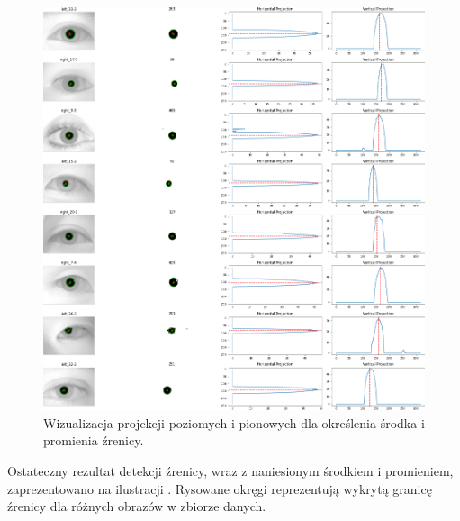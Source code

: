 \documentclass[a4paper]{article}
\begin{document}
\begin{figure}[H]
    \centering
    \includegraphics[width=0.9\linewidth]{figures/pupils_projections_many.png}
    \caption{Wizualizacja projekcji poziomych i pionowych dla określenia środka i promienia źrenicy.}
    \label{fig:pupils_projections_many}
\end{figure}

Ostateczny rezultat detekcji źrenicy, wraz z naniesionym środkiem i promieniem, zaprezentowano na ilustracji . Rysowane okręgi reprezentują wykrytą granicę źrenicy dla różnych obrazów w zbiorze danych.
\end{document}
